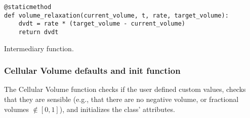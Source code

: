 \begin{listing}[!htbp]
\begin{verbatim}
@staticmethod
def volume_relaxation(current_volume, t, rate, target_volume):
    dvdt = rate * (target_volume - current_volume)
    return dvdt
\end{verbatim}
\caption{Intermediary  function.}\label{code:vol:relax}
\end{listing}


\subsubsection{Cellular Volume defaults and init function}
The Cellular Volume  function checks if the user defined custom values, checks that they are sensible (e.g., that there are no negative volume, or fractional volumes $\notin [0, 1]$), and initializes the class' attributes. 